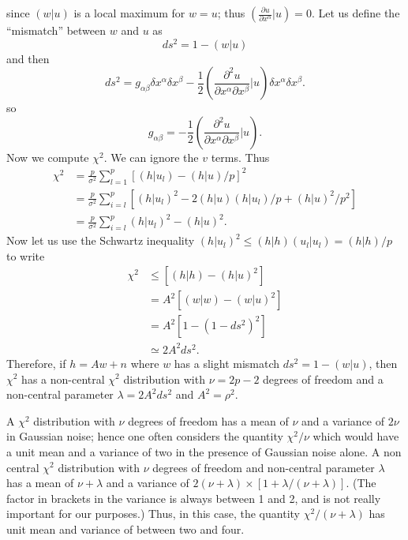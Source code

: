 since $(w|u)$ is a local maximum for $w=u$; thus $(\frac{\partial u}{\partial x^\alpha}|u)=0$.
Let us define the ``mismatch'' between $w$ and $u$ as
\begin{equation}
ds^2 = 1 - (w|u)
\end{equation}
and then
\begin{equation}
  ds^2 = g_{\alpha\beta}\delta x^\alpha\delta x^\beta
  - \frac{1}{2} \left(\frac{\partial^ 2u}{\partial x^\alpha \partial x^\beta}\bigl|u\right)\delta x^\alpha\delta x^\beta.
\end{equation}
so
\begin{equation}
g_{\alpha\beta}=-{\frac{1}{2}}\left(\frac{\partial^2 u}{\partial x^\alpha\partial x^\beta}\bigl|u\right).
\end{equation}
Now we compute $\chi^2$.  We can ignore the $v$ terms.  Thus
\begin{equation}
\begin{split}
\chi^2 &= \frac{p}{\sigma^2} \sum_{l=1}^p \left[ (h|u_l) - (h|u)/p \right]^2  \\
&= \frac{p}{\sigma^2} \sum_{i=l}^p \left[ (h|u_l)^2 - 2(h|u)(h|u_l)/p + (h|u)^2/p^2 \right] \\
&= \frac{p}{\sigma^2}\sum_{i=l}^p (h|u_l)^2 - (h|u)^2.
\end{split}
\end{equation}
Now let us use the Schwartz inequality $(h|u_l)^2\le(h|h)(u_l|u_l)=(h|h)/p$ to
write
\begin{equation}
\begin{split}
\chi^2 &\le \left[ (h|h) - (h|u)^2 \right]  \\
&= A^2\left[ (w|w) - (w|u)^2 \right] \\
&= A^2 \left[ 1 - ( 1 - ds^2 )^2 \right] \\
&\simeq 2A^2ds^2.
\end{split}
\end{equation}
Therefore, if $h=Aw+n$ where $w$ has a slight mismatch $ds^2=1-(w|u)$, then
$\chi^2$ has a non-central $\chi^2$ distribution with $\nu=2p-2$ degrees of
freedom and a non-central parameter $\lambda=2A^2ds^2$ and $A^2 =
\rho^2$.

A $\chi^2$ distribution with $\nu$ degrees of freedom has a mean of $\nu$
and a variance of $2\nu$ in Gaussian noise; hence one often considers the
quantity $\chi^2/\nu$ which would have a unit mean and a variance of two in
the presence of Gaussian noise alone.  A non central $\chi^2$ distribution
with $\nu$ degrees of freedom and non-central parameter $\lambda$ has a mean
of $\nu+\lambda$ and a variance of
$2(\nu+\lambda)\times[1+\lambda/(\nu+\lambda)]$.  (The factor in brackets in
the variance is always between 1 and 2, and is not really important for our
purposes.)  Thus, in this case, the quantity $\chi^2/(\nu+\lambda)$ has unit
mean and variance of between two and four.

